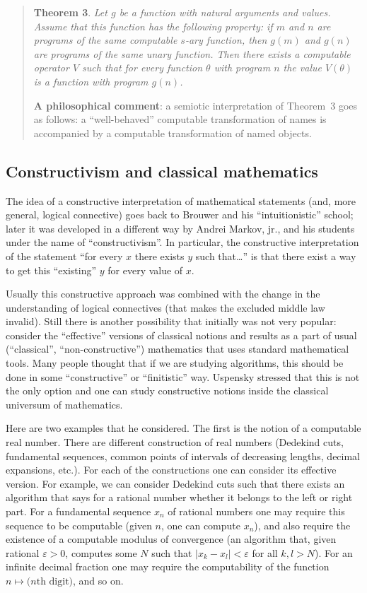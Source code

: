 \documentclass[12pt]{article}
\theoremstyle{remark}
\let\eps=\varepsilon
\begin{document}
\begin{quote}
\textbf{Theorem 3}. \emph{Let $g$ be a function with natural arguments and values. Assume that this function has the following property: if $m$ and $n$ are programs of the same computable $s$-ary function, then $g(m)$ and $g(n)$ are programs of the same unary function. Then there exists a computable operator $V$ such that for every function $\theta$ with program $n$ the value $V(\theta)$ is a function with program $g(n)$.}

\textbf{A philosophical comment}: a semiotic interpretation of Theorem~3 goes as follows: a ``well-behaved'' computable transformation of names is accompanied by a computable transformation of named objects.

\end{quote}

\subsection*{Constructivism and classical mathematics}

The idea of a constructive interpretation of mathematical statements (and, more general, logical connective) goes back to Brouwer and his ``intuitionistic'' school; later it was developed in a different way by Andrei Markov, jr., and his students under the name of ``constructivism''.  In particular, the constructive interpretation of the statement ``for every $x$ there exists $y$ such that\ldots'' is that there exist a way to get this ``existing'' $y$ for every value of $x$.

Usually this constructive approach was combined with the change in the understanding of logical connectives (that makes the excluded middle law invalid). Still there is another possibility that initially was not very popular: consider the ``effective'' versions of classical notions and results as a part of usual (``classical'', ``non-constructive'') mathematics that uses standard mathematical tools. Many people thought that if we are studying algorithms, this should be done in some ``constructive'' or ``finitistic'' way. Uspensky stressed that this is not the only option and one can study constructive notions inside the classical universum of mathematics.

Here are two examples that he considered. The first is the notion of a computable real number. There are different construction of real numbers (Dedekind cuts, fundamental sequences,  common points of intervals of decreasing lengths, decimal expansions, etc.). For each of the constructions one can consider its effective version. For example, we can consider Dedekind cuts such that there exists an algorithm that says for a rational number whether it belongs to the left or right part. For a fundamental sequence $x_n$ of rational numbers one may require this sequence to be computable (given $n$, one can compute $x_n$), and also require the existence of a computable modulus of convergence (an algorithm that, given rational $\eps>0$, computes some $N$ such that $|x_k-x_l|<\eps$ for all $k,l>N$). For an infinite decimal fraction one may require the computability of the function $n\mapsto \text{($n$th digit)}$, and so on.
\end{document}
